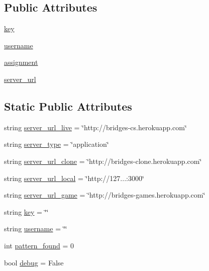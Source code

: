 \subsection*{Public Attributes}
\begin{DoxyCompactItemize}
\item 
\mbox{\hyperlink{classbridges_1_1connector_1_1_connector_afeae8bc992dfa4336a6cc766d8414e6f}{key}}
\item 
\mbox{\hyperlink{classbridges_1_1connector_1_1_connector_adeb8d1b493eae70c24127fb175e1bfe7}{username}}
\item 
\mbox{\hyperlink{classbridges_1_1connector_1_1_connector_a2df020c062b6224d4eeb2c5407c02656}{assignment}}
\item 
\mbox{\hyperlink{classbridges_1_1connector_1_1_connector_abcc06e345e43916cf975eb200187d911}{server\+\_\+url}}
\end{DoxyCompactItemize}
\subsection*{Static Public Attributes}
\begin{DoxyCompactItemize}
\item 
string \mbox{\hyperlink{classbridges_1_1connector_1_1_connector_a10c26bfaf2718f837e7bddfd7715b729}{server\+\_\+url\+\_\+live}} = \char`\"{}http\+://bridges-\/cs.\+herokuapp.\+com\char`\"{}
\item 
string \mbox{\hyperlink{classbridges_1_1connector_1_1_connector_ab5146d539819322f0b0e121a56356ba2}{server\+\_\+type}} = \char`\"{}application\char`\"{}
\item 
string \mbox{\hyperlink{classbridges_1_1connector_1_1_connector_a9048518314ac4902eda88f8457154b63}{server\+\_\+url\+\_\+clone}} = \char`\"{}http\+://bridges-\/clone.\+herokuapp.\+com\char`\"{}
\item 
string \mbox{\hyperlink{classbridges_1_1connector_1_1_connector_a7d58b50fbd7d10f805957ec620135ef7}{server\+\_\+url\+\_\+local}} = \char`\"{}http\+://127...\+:3000\char`\"{}
\item 
string \mbox{\hyperlink{classbridges_1_1connector_1_1_connector_ad2c0c9e4bff85bbfb05816fc9a3515fc}{server\+\_\+url\+\_\+game}} = \char`\"{}http\+://bridges-\/games.\+herokuapp.\+com\char`\"{}
\item 
string \mbox{\hyperlink{classbridges_1_1connector_1_1_connector_a3b577c34402fea1910f56fd9cac51c07}{key}} = \char`\"{}\char`\"{}
\item 
string \mbox{\hyperlink{classbridges_1_1connector_1_1_connector_af2f4f996092cf63a5e7940ca93a2c6b7}{username}} = \char`\"{}\char`\"{}
\item 
int \mbox{\hyperlink{classbridges_1_1connector_1_1_connector_ad137981eae887e1f050216edb7670d35}{pattern\+\_\+found}} = 0
\item 
bool \mbox{\hyperlink{classbridges_1_1connector_1_1_connector_a05ea0150f79561e26b725654fe8ff7dc}{debug}} = False
\end{DoxyCompactItemize}


